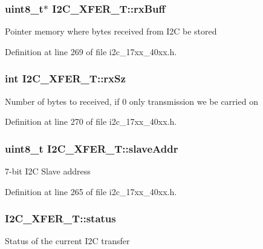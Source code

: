 \subsubsection[{\texorpdfstring{rx\+Buff}{rxBuff}}]{\setlength{\rightskip}{0pt plus 5cm}uint8\+\_\+t$\ast$ I2\+C\+\_\+\+X\+F\+E\+R\+\_\+\+T\+::rx\+Buff}\hypertarget{structI2C__XFER__T_a905dce25e8fc1dc85c4b76e789f62623}{}\label{structI2C__XFER__T_a905dce25e8fc1dc85c4b76e789f62623}
Pointer memory where bytes received from I2C be stored 

Definition at line 269 of file i2c\+\_\+17xx\+\_\+40xx.\+h.

\subsubsection[{\texorpdfstring{rx\+Sz}{rxSz}}]{\setlength{\rightskip}{0pt plus 5cm}int I2\+C\+\_\+\+X\+F\+E\+R\+\_\+\+T\+::rx\+Sz}\hypertarget{structI2C__XFER__T_a8c5b062847cfd0fe9b27058743de8aa5}{}\label{structI2C__XFER__T_a8c5b062847cfd0fe9b27058743de8aa5}
Number of bytes to received, if 0 only transmission we be carried on 

Definition at line 270 of file i2c\+\_\+17xx\+\_\+40xx.\+h.

\subsubsection[{\texorpdfstring{slave\+Addr}{slaveAddr}}]{\setlength{\rightskip}{0pt plus 5cm}uint8\+\_\+t I2\+C\+\_\+\+X\+F\+E\+R\+\_\+\+T\+::slave\+Addr}\hypertarget{structI2C__XFER__T_a39393422071ba7bca5d22e15b110e723}{}\label{structI2C__XFER__T_a39393422071ba7bca5d22e15b110e723}
7-\/bit I2C Slave address 

Definition at line 265 of file i2c\+\_\+17xx\+\_\+40xx.\+h.

\subsubsection[{\texorpdfstring{status}{status}}]{ I2\+C\+\_\+\+X\+F\+E\+R\+\_\+\+T\+::status}\hypertarget{structI2C__XFER__T_aefc3cfe9bf7cdaeb2a632c42250602ad}{}\label{structI2C__XFER__T_aefc3cfe9bf7cdaeb2a632c42250602ad}
Status of the current I2C transfer 

